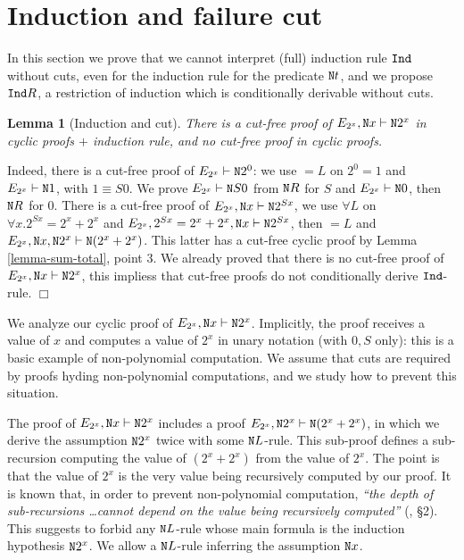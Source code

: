 \documentclass[a4paper,12pt]{article}
\newtheorem{lemma}[theorem]{Lemma}
\newenvironment{proof}[1][Proof]{\begin{trivlist}
\item[\hskip \labelsep {\bfseries #1}]}{\end{trivlist}}
\newcommand{\Nat}               { {\tt N}  }
\newcommand{\Ind}            { {\tt Ind} }
\newcommand{\eqL}     {= \! \!  \!  L}
\begin{document}
\section{Induction and failure cut}

In this section we prove that we cannot interpret (full) induction rule $\Ind$ without cuts, even for the induction rule for the predicate $\Nat t$, and we propose $\Ind R$, a restriction of induction which is conditionally derivable without cuts. 

\begin{lemma}[Induction and cut]
\label{lemma-induction-cut}
There is a cut-free proof of $E_{2^x}, \Nat x \vdash \Nat 2^x$ in cyclic proofs $+$ induction rule, and no cut-free proof in cyclic proofs.
\end{lemma}

\begin{proof}
Indeed, there is a cut-free proof of $E_{2^x} \vdash \Nat 2^0$: we use $\eqL$ on $2^0=1$ and $E_{2^x} \vdash \Nat 1$, with $1 \equiv S0$. We prove $E_{2^x} \vdash \Nat S0$ from $\Nat R$ for $S$ and $E_{2^x} \vdash \Nat 0$, then $\Nat R$ for $0$. There is a cut-free proof of $E_{2^x}, \Nat x \vdash \Nat 2^{Sx}$, we use $\forall L$ on $\forall x.2^{Sx}=2^x + 2^x$ and $E_{2^x}, 2^{Sx}=2^x + 2^x, \Nat x \vdash \Nat 2^{Sx}$, then $\eqL$ and $E_{2^x}, \Nat x, \Nat 2^x  \vdash \Nat (2^{x} + 2^x)$. This latter has a cut-free cyclic proof by Lemma \ref{lemma-sum-total}, point $3$. We already proved that there is no cut-free proof of $E_{2^x}, \Nat x \vdash \Nat 2^x$, this impliess that cut-free proofs do not conditionally derive $\Ind$-rule.
$\Box$ \end{proof}

We analyze our cyclic proof of $E_{2^x}, \Nat x \vdash \Nat 2^x$. Implicitly, the proof receives a value of $x$ and computes a value of $ 2^x$ in unary notation (with $0,S$ only): this is a basic example of non-polynomial computation. We assume that cuts are required by proofs hyding non-polynomial computations, and we study how to prevent this situation.

The proof of $E_{2^x}, \Nat x \vdash \Nat 2^x$ includes a proof $E_{2^x}, \Nat 2^x \vdash  \Nat (2^{x} + 2^x)$, in which we derive the assumption $ \Nat 2^x$ twice with some $\Nat L$-rule. This sub-proof defines a sub-recursion computing the value of $(2^{x} + 2^x)$ from the value of $2^x$. The point is that the value of $2^x$ is the very value being recursively computed by our proof. It is known that, in order to prevent non-polynomial computation, \emph{``the depth of sub-recursions \ldots cannot depend on the value being recursively computed''} (\cite{Bellantoni-Cook}, \S 2). This suggests to forbid any $\Nat L$-rule whose main formula is the induction hypothesis $\Nat 2^x$. We allow a $\Nat L$-rule inferring the assumption $\Nat x$. 
\end{document}
